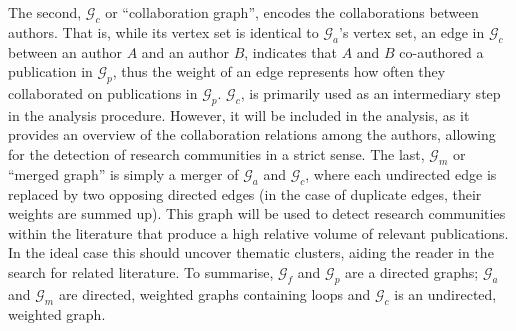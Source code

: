 \documentclass[11pt,a4paper]{book}
\theoremstyle{definition}
\theoremstyle{definition}
\theoremstyle{definition}
\theoremstyle{remark}
\newcommand{\tgraph}{\mathcal{G}_{f}}
\newcommand{\pgraph}{\mathcal{G}_{p}}
\newcommand{\agraph}{\mathcal{G}_{a}}
\newcommand{\cgraph}{\mathcal{G}_{c}}
\newcommand{\acgraph}{\mathcal{G}_{m}}
\begin{document}
The second, $\cgraph$ or ``collaboration graph'', encodes the collaborations between authors. That is, while its vertex set is identical to $\agraph$'s vertex set, an edge in $\cgraph$ between an author $A$ and an author $B$, indicates that $A$ and $B$ co-authored a publication in $\pgraph$, thus the weight of an edge represents how often they collaborated on publications in $\pgraph$.  $\cgraph$, is primarily used as an intermediary step in the analysis procedure. However, it will be included in the analysis, as it provides an overview of the collaboration relations among the authors, allowing for the detection of research communities in a strict sense. 
The last, $\acgraph$ or ``merged graph'' is simply a merger of $\agraph$ and $\cgraph$, where each undirected edge is replaced by two opposing directed edges (in the case of duplicate edges, their weights are summed up).
This graph will be used to detect research communities within the literature that produce a high relative volume of relevant publications. In the ideal case this should uncover thematic clusters, aiding the reader in the search for related literature.
To summarise, $\tgraph$ and $\pgraph$ are a directed graphs; $\agraph$ and $\acgraph$ are directed, weighted graphs containing loops and $\cgraph$ is an undirected, weighted graph. 
\end{document}
